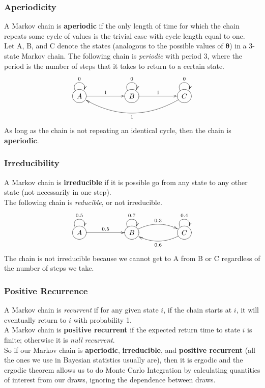 \documentclass[handout]{beamer}
\begin{document}
\begin{frame}
\frametitle{Aperiodicity}
\pause
A Markov chain is \textbf{aperiodic} if the only length of time for
which the chain repeats some cycle of values is the trivial case with
cycle length equal to one.\\
\pause
\bigskip
Let A, B, and C denote the states (analogous to the possible values of
$\bm{\theta}$) in a 3-state Markov chain.  \pause The following chain
is \textit{periodic} with period 3, where the period is the number of
steps that it takes to return to a certain state.
\pause
$$
\xymatrix{
*++[o][F-]{A} \ar@(ul,ur)^0 \ar[rr]^1 && *++[o][F-]{B}
\ar@(ul,ur)^0 \ar[rr]^1 && *++[o][F-]{C} \ar@(ul,ur)^0 \ar@/^2pc/[llll]^1
}
$$
\pause
As long as the chain is not repeating an identical cycle, then the
chain is \textbf{aperiodic}.
\end{frame}

\begin{frame}
\frametitle{Irreducibility}
\pause
A Markov chain is \textbf{irreducible} if it is possible go from any state to
any other state (not necessarily in one step).\\
\bigskip
\pause
The following chain is \textit{reducible}, or not irreducible.
\pause
$$
\xymatrix{
*++[o][F-]{A} \ar@(ul,ur)^{0.5} \ar[rr]^{0.5} && *++[o][F-]{B}
\ar@(ul,ur)^{0.7} \ar@/^1pc/[rr]^{0.3} && *++[o][F-]{C} \ar@(ul,ur)^{0.4} \ar@/^1pc/[ll]^{0.6}
}
$$
\pause
The chain is not irreducible because we cannot get to A from B or C
regardless of the number of steps we take.
\end{frame}

\begin{frame}
\frametitle{Positive Recurrence}
\pause
A Markov chain is \textit{recurrent} if for any given state $i$, if
the chain starts at $i$, it will eventually return to $i$ with
probability 1. \\
\bigskip
\pause
A Markov chain is \textbf{positive recurrent} if the expected return
time to state $i$ is finite; \pause otherwise it is \textit{null recurrent}.\\
\pause
\bigskip
\bigskip
So if our Markov chain is \textbf{aperiodic}, \textbf{irreducible},
and \textbf{positive recurrent} (all the ones we use in
Bayesian statistics usually are), then it is ergodic and the ergodic
theorem allows us to do Monte Carlo Integration by calculating quantities of interest from our draws,
ignoring the dependence between draws.
\end{frame}
\end{document}
